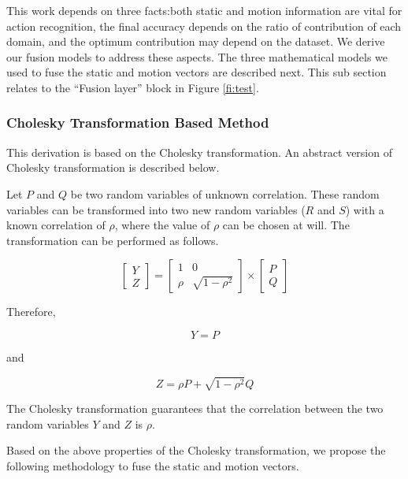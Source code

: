 
This work depends on three facts:both static and motion information
are vital for action recognition, the final accuracy depends on the ratio of contribution of each domain,
and the optimum contribution may depend on the dataset. We derive our fusion models to address these aspects. 
The three mathematical models we used
to fuse the static and motion vectors are described next. This sub section relates to the ``Fusion layer'' block in Figure \ref{fi:test}.

\subsubsection{Cholesky Transformation Based Method}

This derivation is based on the Cholesky transformation. An 
abstract version of Cholesky transformation is described below. 

Let $P$ and $Q$ be two random variables of unknown correlation. These random variables can be
transformed into two new random variables ($R$ and $S$) with a known correlation of $\rho$, where the 
value of $\rho$ can be chosen at will. The transformation can be performed as follows.

\begin{equation}
\begin{bmatrix}
    Y     \\
    Z     
\end{bmatrix}
=
\begin{bmatrix}
    1  & 0 \\
    \rho  & \sqrt{1-\rho^2}    
\end{bmatrix}
\times
\begin{bmatrix}
    P     \\
    Q     
\end{bmatrix}
\end{equation}

Therefore,

\begin{equation}
Y = P
\end{equation}

and

\begin{equation}
Z = \rho P + \sqrt{1-\rho^2}Q
\end{equation}

The Cholesky transformation guarantees that the correlation between the two random variables
$Y$ and $Z$ is $\rho$.

Based on the above properties of the Cholesky transformation, we propose the following methodology to fuse the static and
motion vectors.


